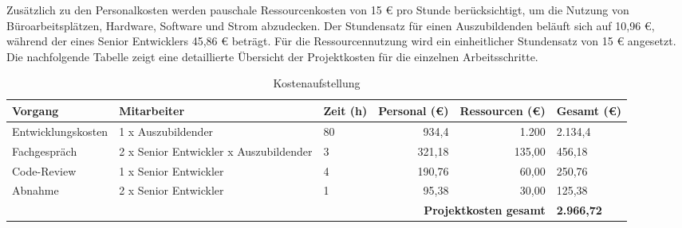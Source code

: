 Zusätzlich zu den Personalkosten werden pauschale Ressourcenkosten von 15 € pro Stunde berücksichtigt, um die Nutzung von Büroarbeitsplätzen, Hardware, Software und Strom abzudecken. Der Stundensatz für einen Auszubildenden beläuft sich auf 10,96 €, während der eines Senior Entwicklers 45,86 € beträgt. Für die Ressourcennutzung wird ein einheitlicher Stundensatz von 15 € angesetzt. Die nachfolgende Tabelle zeigt eine detaillierte Übersicht der Projektkosten für die einzelnen Arbeitsschritte.
\begin{table}[h!]
    \centering
    \footnotesize %
    \renewcommand{\arraystretch}{1.2} %
    \setlength{\tabcolsep}{7pt} %
    \begin{tabular*}{\textwidth}{|p{2.7cm}|p{3.0cm}|p{1.5cm}|r|r|p{1.9cm}|} %
    \hline
    \textbf{Vorgang}       & \textbf{Mitarbeiter}                 & \textbf{Zeit (h)} & \textbf{Personal (€)\footnotemark[6]} & \textbf{Ressourcen (€)\footnotemark[7]} & \textbf{Gesamt (€)} \\ \hline
    Entwicklungskosten     & 1 x Auszubildender                  & 80                & 934,4                 & 1.200                 & 2.134,4           \\ \hline
    Fachgespräch           & 2 x Senior Entwickler\newline 1 x Auszubildender & 3                 & 321,18                 & 135,00                   & 456,18             \\ \hline
    Code-Review            & 1 x Senior Entwickler                      & 4                 & 190,76                 & 60,00                    & 250,76             \\ \hline
    Abnahme                & 2 x Senior Entwickler                      & 1                 & 95,38                  & 30,00                    & 125,38              \\ \hline
    \multicolumn{5}{|r|}{\textbf{Projektkosten gesamt}} & \textbf{2.966,72} \\ \hline
    \end{tabular*}
    \caption{Kostenaufstellung}
    \label{tab:Kostenaufstellung}
\end{table}


